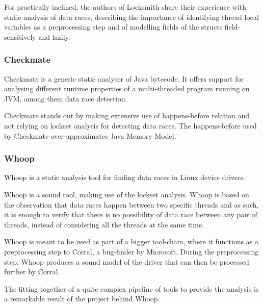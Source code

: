 \documentclass[..thesis.tex]{subfiles}
\begin{document}
For practically inclined, the authors of Locksmith share their experience with static analysis of data races, describing the importance of identifying thread-local variables as a preprocessing step and of modelling fields of the structs field-sensitively and lazily\cite{pratikakis_locksmith_2011}.




\subsubsection{Checkmate}

Checkmate\cite{ferrara_checkmate_2009} is a generic static analyser of Java bytecode. It offers support for analysing different runtime properties of a multi-threaded program running on JVM, among them data race detection.

Checkmate stands out by making extensive use of happens-before relation and not relying on lockset analysis for detecting data races. The happens-before used by Checkmate over-approximates Java Memory Model.





\subsubsection{Whoop}

Whoop\cite{deligiannis_fast_2015} is a static analysis tool for finding data races in Linux device drivers. 

Whoop is a sound tool, making use of the lockset analysis. Whoop is based on the observation that data races happen between two specific threads and as such, it is enough to verify that there is no possibility of data race between any pair of threads, instead of considering all the threads at the same time.

Whoop is meant to be used as part of a bigger tool-chain, where it functions as a preprocessing step to Corral, a bug-finder by Microsoft. During the preprocessing step, Whoop produces a sound model of the driver that can then be processed further by Corral.

The fitting together of a quite complex pipeline of tools to provide the analysis is a remarkable result of the project behind Whoop.
\end{document}
